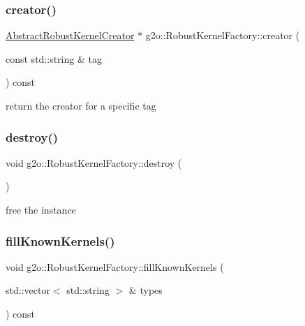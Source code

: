 \subsubsection{\texorpdfstring{creator()}{creator()}}
{\footnotesize\ttfamily \mbox{\hyperlink{classg2o_1_1_abstract_robust_kernel_creator}{Abstract\+Robust\+Kernel\+Creator}} $\ast$ g2o\+::\+Robust\+Kernel\+Factory\+::creator (\begin{DoxyParamCaption}\item[{const std\+::string \&}]{tag }\end{DoxyParamCaption}) const}

return the creator for a specific tag \mbox{\label{classg2o_1_1_robust_kernel_factory_a6c96f77eb4a14e5e8f5b46eb734c0393}} 
\subsubsection{\texorpdfstring{destroy()}{destroy()}}
{\footnotesize\ttfamily void g2o\+::\+Robust\+Kernel\+Factory\+::destroy (\begin{DoxyParamCaption}{ }\end{DoxyParamCaption})\hspace{0.3cm}{\ttfamily [static]}}



free the instance 

\mbox{\label{classg2o_1_1_robust_kernel_factory_a078e96a0ca100165d18b146f07813765}} 
\subsubsection{\texorpdfstring{fill\+Known\+Kernels()}{fillKnownKernels()}}
{\footnotesize\ttfamily void g2o\+::\+Robust\+Kernel\+Factory\+::fill\+Known\+Kernels (\begin{DoxyParamCaption}\item[{std\+::vector$<$ std\+::string $>$ \&}]{types }\end{DoxyParamCaption}) const}

